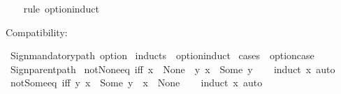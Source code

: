 \begin{isabellebody}
%
\isadelimproof
\ \ %
\endisadelimproof
%
\isatagproof
{}\isamarkupfalse%
\ {\isacharparenleft}{\kern0pt}rule\ option{\isachardot}{\kern0pt}induct{\isacharparenright}{\kern0pt}%
\endisatagproof
{\isafoldproof}%
%
\isadelimproof
%
\endisadelimproof
%
\begin{isamarkuptext}%
Compatibility:%
\end{isamarkuptext}\isamarkuptrue%
%
\isadelimML
%
\endisadelimML
%
\isatagML
{}\isamarkupfalse%
\ {\isacartoucheopen}Sign{\isachardot}{\kern0pt}mandatory{\isacharunderscore}{\kern0pt}path\ {\isachardoublequote}{\kern0pt}option{\isachardoublequote}{\kern0pt}{\isacartoucheclose}%
\endisatagML
{\isafoldML}%
%
\isadelimML
%
\endisadelimML
\isanewline
{}\isamarkupfalse%
\ inducts\ {\isacharequal}{\kern0pt}\ option{\isachardot}{\kern0pt}induct\isanewline
{}\isamarkupfalse%
\ cases\ {\isacharequal}{\kern0pt}\ option{\isachardot}{\kern0pt}case\isanewline
%
\isadelimML
%
\endisadelimML
%
\isatagML
{}\isamarkupfalse%
\ {\isacartoucheopen}Sign{\isachardot}{\kern0pt}parent{\isacharunderscore}{\kern0pt}path{\isacartoucheclose}%
\endisatagML
{\isafoldML}%
%
\isadelimML
\isanewline
%
\endisadelimML
\isanewline
{}\isamarkupfalse%
\ not{\isacharunderscore}{\kern0pt}None{\isacharunderscore}{\kern0pt}eq\ {\isacharbrackleft}{\kern0pt}iff{\isacharbrackright}{\kern0pt}{\isacharcolon}{\kern0pt}\ {\isachardoublequoteopen}x\ {\isasymnoteq}\ None\ {\isasymlongleftrightarrow}\ {\isacharparenleft}{\kern0pt}{\isasymexists}y{\isachardot}{\kern0pt}\ x\ {\isacharequal}{\kern0pt}\ Some\ y{\isacharparenright}{\kern0pt}{\isachardoublequoteclose}\isanewline
%
\isadelimproof
\ \ %
\endisadelimproof
%
\isatagproof
{}\isamarkupfalse%
\ {\isacharparenleft}{\kern0pt}induct\ x{\isacharparenright}{\kern0pt}\ auto%
\endisatagproof
{\isafoldproof}%
%
\isadelimproof
\isanewline
%
\endisadelimproof
\isanewline
{}\isamarkupfalse%
\ not{\isacharunderscore}{\kern0pt}Some{\isacharunderscore}{\kern0pt}eq\ {\isacharbrackleft}{\kern0pt}iff{\isacharbrackright}{\kern0pt}{\isacharcolon}{\kern0pt}\ {\isachardoublequoteopen}{\isacharparenleft}{\kern0pt}{\isasymforall}y{\isachardot}{\kern0pt}\ x\ {\isasymnoteq}\ Some\ y{\isacharparenright}{\kern0pt}\ {\isasymlongleftrightarrow}\ x\ {\isacharequal}{\kern0pt}\ None{\isachardoublequoteclose}\isanewline
%
\isadelimproof
\ \ %
\endisadelimproof
%
\isatagproof
{}\isamarkupfalse%
\ {\isacharparenleft}{\kern0pt}induct\ x{\isacharparenright}{\kern0pt}\ auto%
\endisatagproof

\end{isabellebody}
